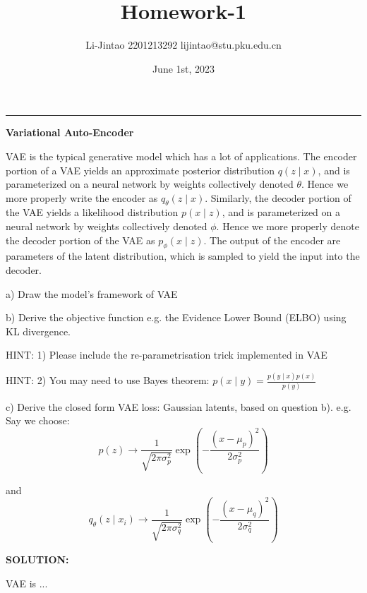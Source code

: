 \documentclass{homework}
\author{Li-Jintao 2201213292 lijintao@stu.pku.edu.cn}
\date{June 1st, 2023}
\title{\Large \textbf{Homework-1}}
\begin{document}
 \maketitle
\rule[0ex]{\textwidth}{1.5pt}
\begin{shaded}
\question \textbf{Variational Auto-Encoder}
    
VAE is the typical generative model which has a lot of applications. The encoder portion of a VAE yields an approximate posterior distribution $q(z \mid x)$, and is parameterized on a neural network by weights collectively denoted $\theta$. Hence we more properly write the encoder as $q_{\theta}(z \mid x)$. Similarly, the decoder portion of the VAE yields a likelihood distribution $p(x \mid z)$, and is parameterized on a neural network by weights collectively denoted $\phi$. Hence we more properly denote the decoder portion of the VAE as $p_{\phi}(x \mid z)$. The output of the encoder are parameters of the latent distribution, which is sampled to yield the input into the decoder.

a) Draw the model's framework of VAE

b) Derive the objective function e.g. the Evidence Lower Bound (ELBO) using KL divergence.

HINT: 1) Please include the re-parametrisation trick implemented in VAE

HINT: 2) You may need to use Bayes theorem: $p(x \mid y)=\frac{p(y \mid x) p(x)}{p(y)}$ 

c) Derive the closed form VAE loss: Gaussian latents, based on question b). e.g. Say we choose:
$$
p(z) \rightarrow \frac{1}{\sqrt{2 \pi \sigma_{p}^{2}}} \exp \left(-\frac{\left(x-\mu_{p}\right)^{2}}{2 \sigma_{p}^{2}}\right)
$$

and
$$
q_{\theta}\left(z \mid x_{i}\right) \rightarrow \frac{1}{\sqrt{2 \pi \sigma_{q}^{2}}} \exp \left(-\frac{\left(x-\mu_{q}\right)^{2}}{2 \sigma_{q}^{2}}\right)
$$
    
\end{shaded}
\textbf{SOLUTION:}

VAE is ...
\end{document}
